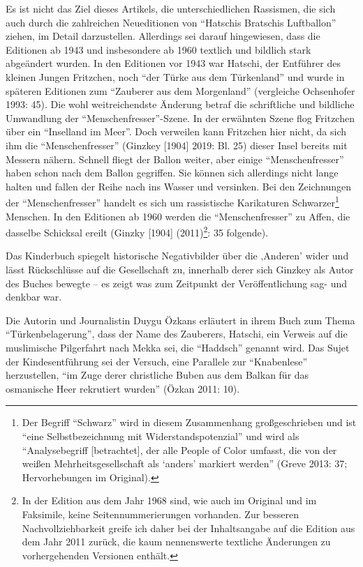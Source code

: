 \documentclass[a4paper,
fontsize=11pt,
oneside,
numbers=noperiodatend,
parskip=half-,
bibliography=totoc,
final
]{scrartcl}
\begin{document}
Es ist nicht das Ziel dieses Artikels, die unterschiedlichen Rassismen,
die sich auch durch die zahlreichen Neueditionen von \enquote{Hatschis
Bratschis Luftballon} ziehen, im Detail darzustellen. Allerdings sei
darauf hingewiesen, dass die Editionen ab 1943 und insbesondere ab 1960
textlich und bildlich stark abgeändert wurden. In den Editionen vor 1943
war Hatschi, der Entführer des kleinen Jungen Fritzchen, noch \enquote{der
Türke aus dem Türkenland} und wurde in späteren Editionen zum
\enquote{Zauberer aus dem Morgenland} (vergleiche Ochsenhofer 1993: 45). Die wohl weitreichendste Änderung
betraf die schriftliche und bildliche Umwandlung der
\enquote{Menschenfresser}-Szene. In der erwähnten Szene flog Fritzchen über
ein \enquote{Inselland im Meer}. Doch verweilen kann Fritzchen hier nicht, da
sich ihm die \enquote{Menschenfresser} (Ginzkey [1904] 2019: Bl. 25)
dieser Insel bereits mit Messern nähern. Schnell fliegt der Ballon
weiter, aber einige \enquote{Menschenfresser} haben schon nach dem Ballon
gegriffen. Sie können sich allerdings nicht lange halten und fallen der
Reihe nach ins Wasser und versinken. Bei den Zeichnungen der
\enquote{Menschenfresser} handelt es sich um rassistische Karikaturen
Schwarzer\footnote{Der Begriff \enquote{Schwarz} wird in diesem Zusammenhang
  großgeschrieben und ist \enquote{eine Selbstbezeichnung mit
  Widerstandspotenzial} und wird als \enquote{Analysebegriff [betrachtet],
  der alle People of Color umfasst, die von der weißen
  Mehrheitsgesellschaft als `anders' markiert werden} (Greve 2013: 37;
  Hervorhebungen im Original).} Menschen. In den Editionen ab 1960
werden die \enquote{Menschenfresser} zu Affen, die dasselbe Schicksal ereilt
(Ginzky [1904] (2011)\footnote{In der Edition aus dem Jahr 1968
  sind, wie auch im Original und im Faksimile, keine
  Seitennummerierungen vorhanden. Zur besseren Nachvollziehbarkeit
  greife ich daher bei der Inhaltsangabe auf die Edition aus dem Jahr
  2011 zurück, die kaum nennenswerte textliche Änderungen zu
  vorhergehenden Versionen enthält.}: 35 folgende).

Das Kinderbuch spiegelt historische Negativbilder über die ‚Anderen'
wider und lässt Rückschlüsse auf die Gesellschaft zu, innerhalb derer
sich Ginzkey als Autor des Buches bewegte -- es zeigt was zum Zeitpunkt
der Veröffentlichung sag- und denkbar war.

Die Autorin und Journalistin Duygu Özkans erläutert in ihrem Buch zum
Thema \enquote{Türkenbelagerung}, dass der Name des Zauberers, Hatschi, ein
Verweis auf die muslimische Pilgerfahrt nach Mekka sei, die \enquote{Haddsch}
genannt wird. Das Sujet der Kindesentführung sei der Versuch, eine
Parallele zur \enquote{Knabenlese} herzustellen, \enquote{im Zuge derer christliche
Buben aus dem Balkan für das osmanische Heer rekrutiert wurden} (Özkan
2011: 10).
\end{document}
